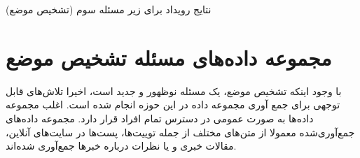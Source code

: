  \begin{table}[ht]
 	\centering
 	\small
	\begin{figure}[H]
	\end{figure}
 	\caption[نتایج رویداد
 	برای زیر مسئله سوم (تشخیص موضع)]
 	{\label{climate_activism_result}  نتایج رویداد
 	برای زیر مسئله سوم (تشخیص موضع)
 	\cite{thapa2024stance}
 }
 \end{table}

\section{مجموعه داده‌های مسئله تشخیص موضع}
با وجود اینکه تشخیص موضع، یک مسئله نوظهور و جدید است، اخیرا تلاش‌های قابل توجهی برای جمع آوری مجموعه داده در این حوزه انجام شده است. اغلب مجموعه دادە‌ها به صورت عمومی در دسترس تمام افراد قرار دارد. مجموعه دادە‌های جمع‌آوری‌شده معمولا از متن‌های مختلف از جمله توییت‌ها، پست‌ها در سایت‌های آنلاین، مقالات خبری و یا نظرات درباره خبرها جمع‌آوری شدە‌اند. 

